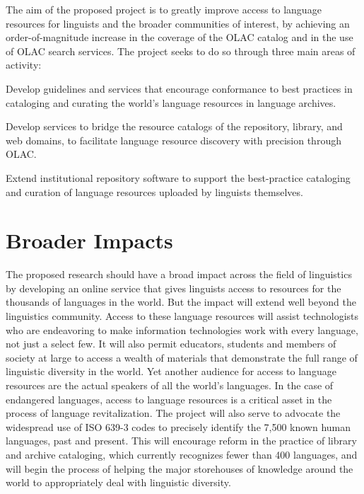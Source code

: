 \documentclass[11pt]{nsf}
\begin{document}
%
%
The aim of the proposed project is to greatly improve access to
language resources for linguists and the broader communities of
interest, by achieving an order-of-magnitude increase in the coverage
of the OLAC catalog and in the use of OLAC search services.  The
project seeks to do so through three main areas of activity:
%
\begin{description}\setlength{\itemsep}{0pt}\setlength{\parskip}{0pt}
  \item[Access to Language Resources in Archives:]
    Develop guidelines and services that encourage conformance to best
    practices in cataloging and curating the world's language resources
    in language archives.

  \item[Access to Language Resources on the Web:]
    Develop services to bridge the resource catalogs of the
    repository, library, and web domains,
    to facilitate language resource discovery with precision through OLAC.

  \item[Access to Language Resources from the Field:]
    Extend institutional repository software to support the
    best-practice cataloging and curation of language resources
    uploaded by linguists themselves.
\end{description}

\section*{Broader Impacts}

The proposed research should have a broad impact across the field of
linguistics by developing an online service that gives linguists
access to resources for the thousands of languages in the world. But
the impact will extend well beyond the linguistics community. Access
to these language resources will assist technologists who are
endeavoring to make information technologies work with every language,
not just a select few.  It will also permit educators, students and
members of society at large to access a wealth of materials that
demonstrate the full range of linguistic diversity in the world.  Yet
another audience for access to language resources are the actual
speakers of all the world's languages.  In the case of endangered
languages, access to language resources is a critical asset in the
process of language revitalization.  The project will also serve to
advocate the widespread use of ISO 639-3 codes to precisely identify
the 7,500 known human languages, past and present.  This will
encourage reform in the practice of library and archive cataloging,
which currently recognizes fewer than 400 languages, and will begin
the process of helping the major storehouses of knowledge around the
world to appropriately deal with linguistic diversity.
\end{document}
